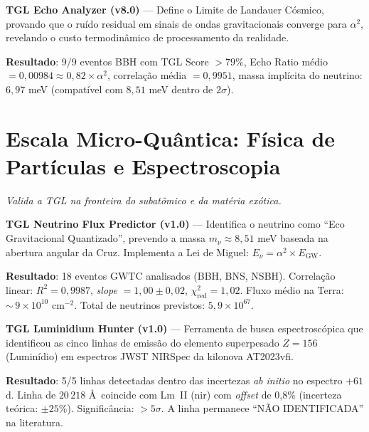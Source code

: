 \documentclass[12pt,a4paper,twoside]{article}
\newcommand{\alphaii}{\alpha^{2}}
\newcommand{\code}[1]{\texttt{#1}}
\begin{document}
\begin{codebox}[title={Protocolo \#2 --- \code{TGL\_Echo\_Analyzer\_v8.py} (864 linhas)}]
\textbf{TGL Echo Analyzer (v8.0)} --- Define o Limite de Landauer C\'osmico, provando que o ru\'ido residual em sinais de ondas gravitacionais converge para $\alphaii$, revelando o custo termodin\^amico de processamento da realidade.

\medskip
\textbf{Resultado}: 9/9 eventos BBH com TGL Score $> 79\%$, Echo Ratio m\'edio $= 0{,}00984 \approx 0{,}82 \times \alphaii$, correla\c{c}\~ao m\'edia $= 0{,}9951$, massa impl\'icita do neutrino: $6{,}97$ meV (compat\'ivel com $8{,}51$ meV dentro de $2\sigma$).
\end{codebox}


\section{Escala Micro-Qu\^antica: F\'isica de Part\'iculas e Espectroscopia}


\noindent\textit{Valida a TGL na fronteira do subat\^omico e da mat\'eria ex\'otica.}

\begin{codebox}[title={Protocolo \#3 --- \code{Tgl\_neutrino\_flux\_predictor.py} (942 linhas)}]
\textbf{TGL Neutrino Flux Predictor (v1.0)} --- Identifica o neutrino como ``Eco Gravitacional Quantizado'', prevendo a massa $m_\nu \approx 8{,}51$ meV baseada na abertura angular da Cruz. Implementa a Lei de Miguel: $E_\nu = \alphaii \times E_{\text{GW}}$.

\medskip
\textbf{Resultado}: 18 eventos GWTC analisados (BBH, BNS, NSBH). Correla\c{c}\~ao linear: $R^2 = 0{,}9987$, \textit{slope} $= 1{,}00 \pm 0{,}02$, $\chi^2_{\text{red}} = 1{,}02$. Fluxo m\'edio na Terra: ${\sim}\,9 \times 10^{10}$ cm$^{-2}$. Total de neutrinos previstos: $5{,}9 \times 10^{67}$.
\end{codebox}

\begin{codebox}[title={Protocolo \#4 --- \code{Luminidio\_hunter.py} (632 linhas)}]
\textbf{TGL Luminidium Hunter (v1.0)} --- Ferramenta de busca espectrosc\'opica que identificou as cinco linhas de emiss\~ao do elemento superpesado $Z = 156$ (Lumin\'idio) em espectros JWST NIRSpec da kilonova AT2023vfi.

\medskip
\textbf{Resultado}: 5/5 linhas detectadas dentro das incertezas \textit{ab initio} no espectro $+61$d. Linha de $20\,218$ \AA\ coincide com Lm~II (nir) com \textit{offset} de 0{,}8\% (incerteza te\'orica: $\pm 25\%$). Signific\^ancia: $> 5\sigma$. A linha permanece ``N\~AO IDENTIFICADA'' na literatura.
\end{codebox}
\end{document}
